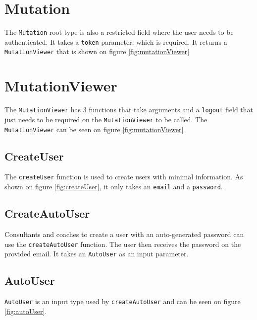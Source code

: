 \section{Mutation}
\label{sec:mutation}
The \verb+Mutation+ root type is also a restricted field where the user needs to be authenticated. 
It takes a \verb+token+ parameter, which is required. 
It returns a \verb+MutationViewer+ that is shown on figure \ref{fig:mutationViewer}

\section{MutationViewer}
The \verb+MutationViewer+ has 3 functions that take arguments and a \verb+logout+ field that just needs to be required on the \verb+MutationViewer+ to be called. The \verb+MutationViewer+ can be seen on figure \ref{fig:mutationViewer}

\subsection{CreateUser}
\label{sec:createUser}
The \verb+createUser+ function is used to create users with minimal information. 
As shown on figure \ref{fig:createUser}, it only takes an \verb+email+ and a \verb+password+.

\subsection{CreateAutoUser}
\label{sec:createAutoUser}
Consultants and coaches to create a user with an auto-generated password can use the \verb+createAutoUser+ function.
The user then receives the password on the provided email.
It takes an \verb+AutoUser+ as an input parameter.

\subsection{AutoUser}
\verb+AutoUser+ is an input type used by \verb+createAutoUser+ and can be seen on figure \ref{fig:autoUser}.

